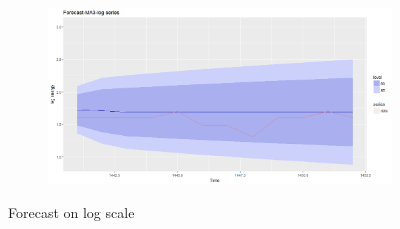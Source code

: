 \documentclass[12pt]{article}
\begin{document}
\begin{figure}[H]
\begin{subfigure}[b]{0.6\linewidth}
  \end{subfigure}
  \begin{subfigure}[b]{0.6\linewidth}
    \includegraphics[width=\linewidth]{figure13-4.png}
  \end{subfigure}
  \caption{Forecast on log scale}
  \label{fig:figure13}
\end{figure}
\end{document}
